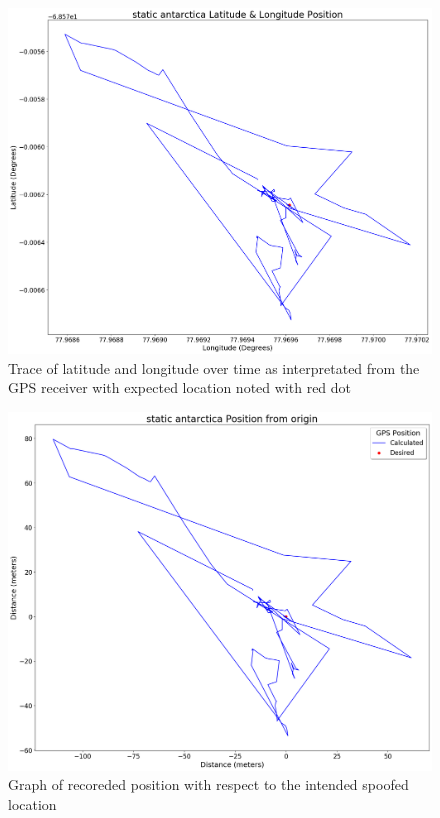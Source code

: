 \begin{figure}[h]
    \begin{centering}
        \includegraphics[width=14cm,keepaspectratio]{Figures/2021_3_30_static_antarctica Lat long position.png}
        \caption{Trace of latitude and longitude over time as interpretated from the GPS receiver with expected location noted with red dot}
        \label{fig:antarcticaStaticCoord}
    \end{centering}
\end{figure}

\begin{figure}[h]
    \begin{centering}
        \includegraphics[width=14cm,keepaspectratio]{Figures/2021_3_30_static_antarctica Position from origin.png}
        \caption{Graph of recoreded position with respect to the intended spoofed location}
        \label{fig:antarcticaStaticPosition}
    \end{centering}
\end{figure}


